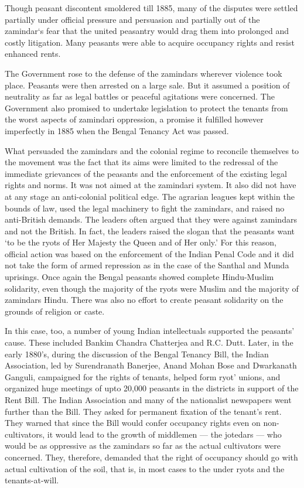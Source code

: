 \begin{multicols}{2}
Though peasant discontent smoldered till 1885, many of the disputes were settled partially under official pressure and persuasion and partially out of the zamindar`s fear that the united peasantry would drag them into prolonged and costly litigation. Many peasants were able to acquire occupancy rights and resist enhanced rents.

The Government rose to the defense of the zamindars wherever violence took place. Peasants were then arrested on a large sale. But it assumed a position of neutrality as far as legal battles or peaceful agitations were concerned. The Government also promised to undertake legislation to protect the tenants from the worst aspects of zamindari oppression, a promise it fulfilled however imperfectly in 1885 when the Bengal Tenancy Act was passed.

What persuaded the zamindars and the colonial regime to reconcile themselves to the movement was the fact that its aims were limited to the redressal of the immediate grievances of the peasants and the enforcement of the existing legal rights and norms. It was not aimed at the zamindari system. It also did not have at any stage an anti-colonial political edge. The agrarian leagues kept within the bounds of law, used the legal machinery to fight the zamindars, and raised no anti-British demands. The leaders often argued that they were against zamindars and not the British. In fact, the leaders raised the slogan that the peasants want `to be the ryots of Her Majesty the Queen and of Her only.' For this reason, official action was based on the enforcement of the Indian Penal Code and it did not take the form of armed repression as in the case of the Santhal and Munda uprisings. Once again the Bengal peasants showed complete Hindu-Muslim solidarity, even though the majority of the ryots were Muslim and the majority of zamindars Hindu. There was also no effort to create peasant solidarity on the grounds of religion or caste.

In this case, too, a number of young Indian intellectuals supported the peasants' cause. These included Bankim Chandra Chatterjea and R.C. Dutt. Later, in the early 1880's, during the discussion of the Bengal Tenancy Bill, the Indian Association, led by Surendranath Banerjee, Anand Mohan Bose and Dwarkanath Ganguli, campaigned for the rights of tenants, helped form ryot' unions, and organized huge meetings of upto 20,000 peasants in the districts in support of the Rent Bill. The Indian Association and many of the nationalist newspapers went further than the Bill. They asked for permanent fixation of the tenant's rent. They warned that since the Bill would confer occupancy rights even on non-cultivators, it would lead to the growth of middlemen --- the jotedars --- who would be as oppressive as the zamindars so far as the actual cultivators were concerned. They, therefore, demanded that the right of occupancy should go with actual cultivation of the soil, that is, in most cases to the under ryots and the tenants-at-will.


\end{multicols}
